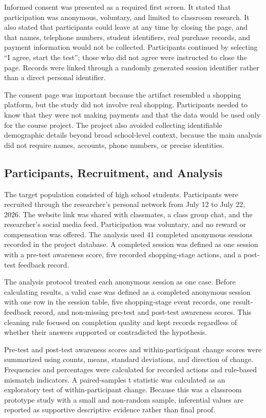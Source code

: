 \documentclass[stu,12pt,floatsintext]{apa7}
\begin{document}
Informed consent was presented as a required first screen. It stated that participation was anonymous, voluntary, and limited to classroom research. It also stated that participants could leave at any time by closing the page, and that names, telephone numbers, student identifiers, real purchase records, and payment information would not be collected. Participants continued by selecting ``I agree, start the test''; those who did not agree were instructed to close the page. Records were linked through a randomly generated session identifier rather than a direct personal identifier.

The consent page was important because the artifact resembled a shopping platform, but the study did not involve real shopping. Participants needed to know that they were not making payments and that the data would be used only for the course project. The project also avoided collecting identifiable demographic details beyond broad school-level context, because the main analysis did not require names, accounts, phone numbers, or precise identities.

\subsection{Participants, Recruitment, and Analysis}

The target population consisted of high school students. Participants were recruited through the researcher's personal network from July 12 to July 22, 2026. The website link was shared with classmates, a class group chat, and the researcher's social media feed. Participation was voluntary, and no reward or compensation was offered. The analysis used 41 completed anonymous sessions recorded in the project database. A completed session was defined as one session with a pre-test awareness score, five recorded shopping-stage actions, and a post-test feedback record.

The analysis protocol treated each anonymous session as one case. Before calculating results, a valid case was defined as a completed anonymous session with one row in the session table, five shopping-stage event records, one result-feedback record, and non-missing pre-test and post-test awareness scores. This cleaning rule focused on completion quality and kept records regardless of whether their answers supported or contradicted the hypothesis.

Pre-test and post-test awareness scores and within-participant change scores were summarized using counts, means, standard deviations, and direction of change. Frequencies and percentages were calculated for recorded actions and rule-based mismatch indicators. A paired-samples t statistic was calculated as an exploratory test of within-participant change. Because this was a classroom prototype study with a small and non-random sample, inferential values are reported as supportive descriptive evidence rather than final proof.
\end{document}
